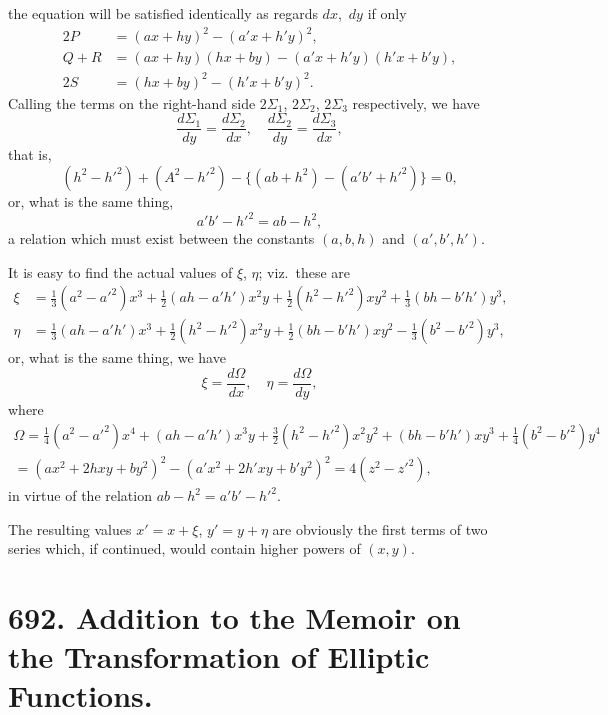 \documentclass[12pt,a4paper]{article}
\begin{document}
\newpage
\noindent the equation will be satisfied identically as regards $dx$,~$dy$ if only
\begin{align*}
2P &= (ax + hy)^2 - (a'x + h'y)^2,\\
Q + R &= (ax + hy)(hx + by) - (a'x + h'y)(h'x + b'y),\\
2S &= (hx + by)^2 - (h'x + b'y)^2.
\end{align*}
Calling the terms on the right-hand side $2\Sigma_1$, $2\Sigma_2$, $2\Sigma_3$ respectively, we have
\[
\frac{d\Sigma_1}{dy} = \frac{d\Sigma_2}{dx},\quad \frac{d\Sigma_2}{dy} = \frac{d\Sigma_3}{dx},
\]
that is,
\[
(h^2 - h'^2) + (A^2 - h'^2) - \{(ab + h^2) - (a'b' + h'^2)\} = 0,
\]
or, what is the same thing,
\[
a'b' - h'^2 = ab - h^2,
\]
a relation which must exist between the constants $(a, b, h)$ and $(a', b', h')$.

It is easy to find the actual values of $\xi$, $\eta$; viz.\ these are
\begin{align*}
\xi &= \tfrac{1}{3}(a^2 - a'^2)x^3 + \tfrac{1}{2}(ah - a'h')x^2y + \tfrac{1}{2}(h^2 - h'^2)xy^2 + \tfrac{1}{3}(bh - b'h')y^3,\\
\eta &= \tfrac{1}{3}(ah - a'h')x^3 + \tfrac{1}{2}(h^2 - h'^2)x^2y + \tfrac{1}{2}(bh - b'h')xy^2 - \tfrac{1}{3}(b^2 - b'^2)y^3,
\end{align*}
or, what is the same thing, we have
\[
\xi = \frac{d\Omega}{dx},\quad \eta = \frac{d\Omega}{dy},
\]
where
\begin{multline*}
\Omega = \tfrac{1}{4}(a^2 - a'^2)x^4 + (ah - a'h')x^3y + \tfrac{3}{2}(h^2 - h'^2)x^2y^2 + (bh - b'h')xy^3 + \tfrac{1}{4}(b^2 - b'^2)y^4\\
= (ax^2 + 2hxy + by^2)^2 - (a'x^2 + 2h'xy + b'y^2)^2 = 4(z^2 - z'^2),
\end{multline*}
in virtue of the relation $ab - h^2 = a'b' - h'^2$.

The resulting values $x' = x + \xi$, $y' = y + \eta$ are obviously the first terms of two series which, if continued, would contain higher powers of $(x, y)$.


\newpage
\section*{692. Addition to the Memoir on the Transformation of Elliptic Functions.}
\label{paper:692}
\end{document}
